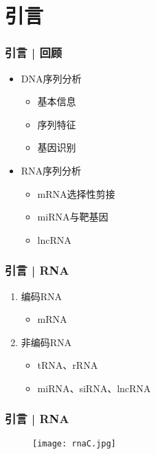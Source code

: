 \section{引言}
\begin{frame}
  \frametitle{引言 | 回顾}
  \begin{itemize}[<+-|alert@+>]
    \item DNA序列分析
      \begin{itemize}
        \item 基本信息
        \item 序列特征
        \item 基因识别
      \end{itemize}
    \item RNA序列分析
      \begin{itemize}
        \item mRNA选择性剪接
        \item miRNA与靶基因
        \item lncRNA
      \end{itemize}
  \end{itemize}
\end{frame}

\begin{frame}
  \frametitle{引言 | RNA}
  \begin{enumerate}
    \item 编码RNA
      \begin{itemize}
        \item mRNA
      \end{itemize}
    \item 非编码RNA
      \begin{itemize}
        \item tRNA、rRNA
        \item miRNA、siRNA、lncRNA
      \end{itemize}
  \end{enumerate}
\end{frame}

\begin{frame}
  \frametitle{引言 | RNA}
  \begin{figure}
    \centering
    \texttt{[image: rnaC.jpg]}
  \end{figure}
\end{frame}

